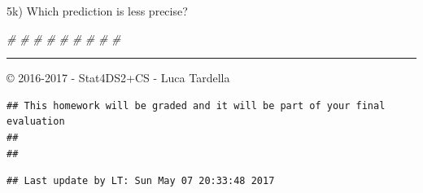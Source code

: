 \documentclass[]{article}
\newenvironment{Shaded}{\begin{snugshade}}{\end{snugshade}}
\newcommand{\CommentTok}[1]{\textcolor[rgb]{0.56,0.35,0.01}{\textit{#1}}}
\begin{document}
5k) Which prediction is less precise?

\begin{Shaded}
\begin{Highlighting}[]
\CommentTok{#}
\CommentTok{#}
\CommentTok{#}
\CommentTok{#}
\CommentTok{#}
\CommentTok{#}
\CommentTok{#}
\CommentTok{#}
\CommentTok{#}
\end{Highlighting}
\end{Shaded}

\vspace*{6cm}

\begin{center}\rule{0.5\linewidth}{\linethickness}\end{center}

© 2016-2017 - Stat4DS2+CS - Luca Tardella

\begin{verbatim}
## This homework will be graded and it will be part of your final evaluation 
## 
## 
\end{verbatim}

\begin{verbatim}
## Last update by LT: Sun May 07 20:33:48 2017
\end{verbatim}
\end{document}
